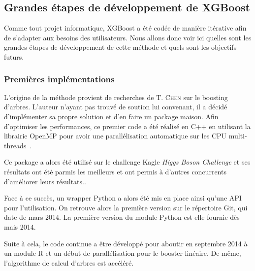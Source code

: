 \subsection{Grandes étapes de développement de XGBoost}
Comme tout projet informatique, XGBoost a été codée de manière itérative afin de s'adapter aux besoins des utilisateurs. Nous allons donc voir ici quelles sont les grandes étapes de développement de cette méthode et quels sont les objectifs futurs.

\subsubsection{Premières implémentations}
L'origine de la méthode provient de recherches de T. \textsc{Chen} sur le boosting d'arbres. L'auteur n'ayant pas trouvé de soution lui convenant, il a décidé d'implémenter sa propre solution et d'en faire un package \og maison\fg. Afin d'optimiser les performances, ce premier code a été réalisé en C++ en utilisant la librairie OpenMP pour avoir une parallélisation automatique sur les CPU multi-threads~\cite{bib:boson}.

Ce package a alors été utilisé sur le challenge Kagle \textit{Higgs Boson Challenge} et ses résultats ont été parmis les meilleurs et ont permis à d'autres concurrents d'améliorer leurs résultats..

Face à ce succès, un wrapper Python a alors été mis en place ainsi qu'une API pour l'utilisation. On retrouve alors la première version sur le répertoire Git, qui date de mars 2014. La première version du module Python est elle fournie dès mais 2014.

Suite à cela, le code continue a être développé pour aboutir en septembre 2014 à un module R et un début de parallélisation pour le booster linéaire. De même, l'algorithme de calcul d'arbres est accéléré.

